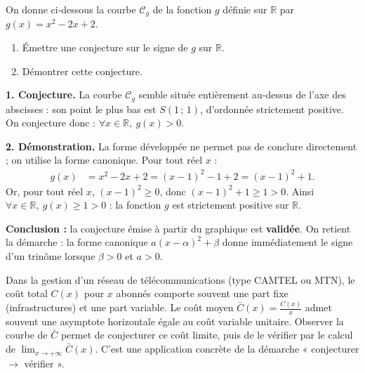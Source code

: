 \documentclass[11pt]{article}
\newcommand{\cle}[1]{{\popxbold\color{popdark}#1}}
\newcommand{\legende}[1]{\par\vspace{6pt}{\popsemi\fontsize{9}{11.5}\selectfont\color{popmuted}#1}}
\begin{document}
\begin{exoresolu}
On donne ci-dessous la courbe $\mathcal{C}_g$ de la fonction $g$ définie sur $\mathbb{R}$ par $g(x)=x^2-2x+2$.
\begin{popfigure}
\begin{center}
\end{center}
\legende{Courbe de $g(x)=x^2-2x+2$}
\end{popfigure}
\begin{enumerate}
\item Émettre une conjecture sur le signe de $g$ sur $\mathbb{R}$.
\item Démontrer cette conjecture.
\end{enumerate}
\tcblower
\textbf{1. Conjecture.} La courbe $\mathcal{C}_g$ semble située entièrement \cle{au-dessus} de l'axe des abscisses : son point le plus bas est $S(1\,;\,1)$, d'ordonnée strictement positive. On conjecture donc : $\forall x\in\mathbb{R},\ g(x)>0$.

\textbf{2. Démonstration.} La forme développée ne permet pas de conclure directement ; on utilise la \cle{forme canonique}. Pour tout réel $x$ :
\begin{align*}
g(x) &= x^2-2x+2 = (x-1)^2 - 1 + 2 = (x-1)^2 + 1.
\end{align*}
Or, pour tout réel $x$, $(x-1)^2 \geq 0$, donc $(x-1)^2 + 1 \geq 1 > 0$.
Ainsi $\forall x\in\mathbb{R},\ g(x) \geq 1 > 0$ : la fonction $g$ est strictement positive sur $\mathbb{R}$.

\textbf{Conclusion :} la conjecture émise à partir du graphique est \textbf{validée}. On retient la démarche : la forme canonique $a(x-\alpha)^2+\beta$ donne immédiatement le signe d'un trinôme lorsque $\beta>0$ et $a>0$.
\end{exoresolu}

\begin{savaistu}
Dans la gestion d'un réseau de télécommunications (type CAMTEL ou MTN), le coût total $C(x)$ pour $x$ abonnés comporte souvent une part fixe (infrastructures) et une part variable. Le coût moyen $\bar{C}(x)=\frac{C(x)}{x}$ admet souvent une asymptote horizontale égale au coût variable unitaire. Observer la courbe de $\bar{C}$ permet de conjecturer ce coût limite, puis de le vérifier par le calcul de $\lim_{x\to+\infty}\bar{C}(x)$. C'est une application concrète de la démarche « conjecturer $\to$ vérifier ».
\end{savaistu}
\end{document}

